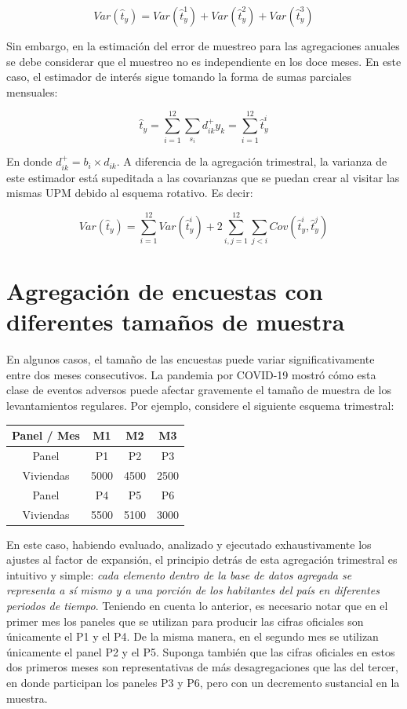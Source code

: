 \documentclass[
  12pt,
  spanish,
]{book}
\begin{document}
\[
Var(\hat{t}_y)
= Var(\hat{t}_{y}^1) + Var(\hat{t}_{y}^2) + Var(\hat{t}_{y}^3)
\]

Sin embargo, en la estimación del error de muestreo para las
agregaciones anuales se debe considerar que el muestreo no es
independiente en los doce meses. En este caso, el estimador de interés
sigue tomando la forma de sumas parciales mensuales:

\[
\hat{t}_y 
= \sum_{i=1}^{12}\sum_{s_i} d_{ik}^+ y_k 
= \sum_{i=1}^{12} \hat{t}_{y}^i
\]

En donde \(d_{ik}^+ = b_i \times d_{ik}\). A diferencia de la agregación trimestral, la varianza de este
estimador está supeditada a las covarianzas que se puedan crear al
visitar las mismas UPM debido al esquema rotativo. Es decir:

\[
Var(\hat{t}_y) 
= \sum_{i=1}^{12} Var(\hat{t}_{y}^i)
+ 2 \sum_{i,j=1}^{12} \sum_{j < i} Cov(\hat{t}_{y}^i, \hat{t}_{y}^j)
\]

\hypertarget{agregaciuxf3n-de-encuestas-con-diferentes-tamauxf1os-de-muestra}{%
\section{Agregación de encuestas con diferentes tamaños de muestra}\label{agregaciuxf3n-de-encuestas-con-diferentes-tamauxf1os-de-muestra}}

En algunos casos, el tamaño de las encuestas puede variar significativamente entre dos meses consecutivos. La pandemia por COVID-19 mostró cómo esta clase de eventos adversos puede afectar gravemente el tamaño de muestra de los levantamientos regulares. Por ejemplo, considere el siguiente esquema trimestral:

\begin{longtable}[]{@{}cccc@{}}
\toprule
Panel / Mes & M1 & M2 & M3 \\
\midrule
\endhead
Panel & P1 & P2 & P3 \\
Viviendas & 5000 & 4500 & 2500 \\
Panel & P4 & P5 & P6 \\
Viviendas & 5500 & 5100 & 3000 \\
\bottomrule
\end{longtable}

En este caso, habiendo evaluado, analizado y ejecutado exhaustivamente los ajustes al factor de expansión, el principio detrás de esta agregación trimestral es intuitivo y simple: \emph{cada elemento dentro de la base de datos agregada se
representa a sí mismo y a una porción de los habitantes del país en
diferentes periodos de tiempo}. Teniendo en cuenta lo anterior, es
necesario notar que en el primer mes los paneles que se utilizan para
producir las cifras oficiales son únicamente el P1 y el P4. De la misma
manera, en el segundo mes se utilizan únicamente el panel P2 y el P5. Suponga también que las cifras oficiales en estos dos primeros meses son representativas de más desagregaciones que las del tercer, en donde participan los paneles P3 y P6, pero con un decremento sustancial en la muestra.
\end{document}
